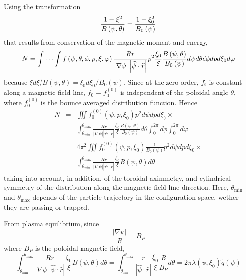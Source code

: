 Using the transformation
\begin{equation}
\frac{1-\xi ^{2}}{B\left( \psi ,\theta \right) }=\frac{1-\xi _{0}^{2}}{%
B_{0}\left( \psi \right) }
\end{equation}
that results from conservation of the magnetic moment and energy,
\begin{equation}
N=\idotsint f\left( \psi ,\theta ,\phi ,p,\xi ,\varphi \right) \frac{Rr}{%
\left| \nabla \psi \right| \left| \widehat{\psi }\cdot \widehat{r}\right| }%
p^{2}\frac{\xi _{0}}{\xi }\frac{B\left( \psi ,\theta \right) }{B_{0}\left(
\psi \right) }d\psi d\theta d\phi dpd\xi _{0}d\varphi
\end{equation}
because $\xi d\xi /B\left( \psi ,\theta \right) =\xi _{0}d\xi
_{0}/B_{0}\left( \psi \right) .$ Since at the zero order, $f_{0}$ is
constant along a magnetic field line, $f_{0}=f_{0}^{\left( 0\right) }$ is
independent of the poloidal angle $\theta ,$ where $f_{0}^{\left( 0\right) }$
is the bounce averaged distribution function. Hence
\begin{eqnarray}
N &=&\iiint f_{0}^{\left( 0\right) }\left( \psi ,p,\xi _{0}\right)
p^{2}d\psi dpd\xi _{0}\times   \nonumber \\
&&\int_{\theta _{\min }}^{\theta _{\max }}\frac{Rr}{\left| \nabla \psi
\right| \left| \widehat{\psi }\cdot \widehat{r}\right| }\frac{\xi _{0}}{\xi }%
\frac{B\left( \psi ,\theta \right) }{B_{0}\left( \psi \right) }d\theta
\int_{0}^{2\pi }d\phi \int_{0}^{2\pi }d\varphi   \nonumber \\
&=&4\pi ^{2}\iiint f_{0}^{\left( 0\right) }\left( \psi ,p,\xi _{0}\right)
\frac{1}{B_{0}\left( \psi \right) }p^{2}d\psi dpd\xi _{0}\times   \nonumber
\\
&&\int_{\theta _{\min }}^{\theta _{\max }}\frac{Rr}{\left| \nabla \psi
\right| \left| \widehat{\psi }\cdot \widehat{r}\right| }\frac{\xi _{0}}{\xi }%
B\left( \psi ,\theta \right) d\theta
\end{eqnarray}
taking into account, in addition, of the toroidal aximmetry, and cylindrical
symmetry of the distribution along the magnetic field line direction. Here, $%
\theta _{\min }$ and $\theta _{\max }$ depends of the particle trajectory in
the configuration space, wether they are passing or trapped.

From plasma equilibrium, since
\begin{equation}
\frac{\left| \nabla \psi \right| }{R}=B_{P}
\end{equation}
where $B_{P}$ is the poloidal magnetic field,
\begin{equation}
\int_{\theta _{\min }}^{\theta _{\max }}\frac{Rr}{\left| \nabla \psi \right|
\left| \widehat{\psi }\cdot \widehat{r}\right| }\frac{\xi _{0}}{\xi }B\left(
\psi ,\theta \right) d\theta =\int_{\theta _{\min }}^{\theta _{\max }}\frac{r%
}{\left| \widehat{\psi }\cdot \widehat{r}\right| }\frac{\xi _{0}}{\xi }\frac{
B}{B_{P}}d\theta =2\pi \lambda \left( \psi ,\xi _{0}\right) \widetilde{q}
\left( \psi \right)
\end{equation}

